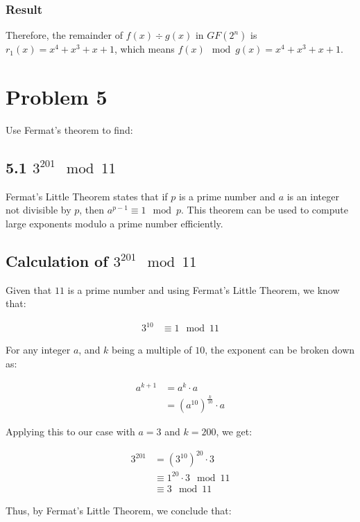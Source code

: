\documentclass[9pt]{article}
\begin{document}
\begin{CJK*}{UTF8}{gbsn}
\subsubsection*{Result}

Therefore, the remainder of $f(x) \div g(x)$ in \(GF(2^n)\) is $r_1(x) = x^4 + x^3 + x + 1$, which means $f(x) \mod g(x) = x^4 + x^3 + x + 1$.

\newpage


\section{Problem 5}
Use Fermat's theorem to find:


\subsection*{5.1 $3^{201} \mod 11$}


Fermat's Little Theorem states that if \(p\) is a prime number and \(a\) is an integer not divisible by \(p\), then \(a^{p-1} \equiv 1 \mod p\). This theorem can be used to compute large exponents modulo a prime number efficiently.

\subsection*{Calculation of \(3^{201} \mod 11\)}

Given that \(11\) is a prime number and using Fermat's Little Theorem, we know that:

\begin{align*}
3^{10} &\equiv 1 \mod 11
\end{align*}

For any integer \(a\), and \(k\) being a multiple of \(10\), the exponent can be broken down as:

\begin{align*}
a^{k + 1} &= a^k \cdot a \\
&= (a^{10})^{\frac{k}{10}} \cdot a
\end{align*}

Applying this to our case with \(a = 3\) and \(k = 200\), we get:

\begin{align*}
3^{201} &= (3^{10})^{20} \cdot 3 \\
&\equiv 1^{20} \cdot 3 \mod 11 \\
&\equiv 3 \mod 11
\end{align*}

Thus, by Fermat's Little Theorem, we conclude that:


\end{CJK*}
\end{document}
